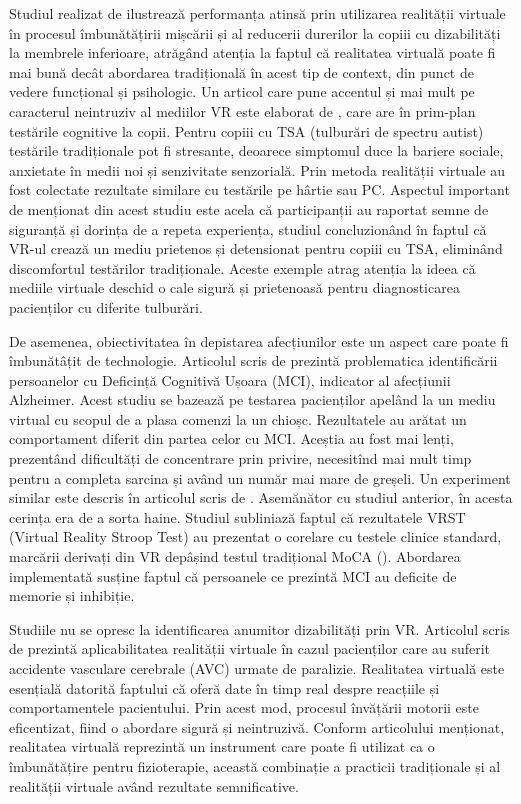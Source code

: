 \documentclass[12pt,a4paper]{report}
\theoremstyle{definition}
\theoremstyle{remark}
\begin{document}
Studiul realizat de \textcite{Saeed2025} ilustrează performanța atinsă prin utilizarea realității virtuale în procesul îmbunătățirii mișcării și al reducerii durerilor la copiii cu dizabilități la membrele inferioare, atrăgând atenția la faptul că realitatea virtuală poate fi mai bună decât abordarea tradițională în acest tip de context, din punct de vedere funcțional și psihologic. Un articol care pune accentul și mai mult pe caracterul neintruziv al mediilor VR este elaborat de \textcite{Tokarskaya2026}, care are în prim-plan testările cognitive la copii. Pentru copiii cu TSA (tulburări de spectru autist) testările tradiționale pot fi stresante, deoarece simptomul duce la bariere sociale, anxietate în medii noi și senzivitate senzorială. Prin metoda realității virtuale au fost colectate rezultate similare cu testările pe hârtie sau PC. Aspectul important de menționat din acest studiu este acela că participanții au raportat semne de siguranță și dorința de a repeta experiența, studiul concluzionând în faptul că VR-ul crează un mediu prietenos și detensionat pentru copiii cu TSA, eliminând discomfortul testărilor tradiționale. Aceste exemple atrag atenția la ideea că mediile virtuale deschid o cale sigură și prietenoasă pentru diagnosticarea pacienților cu diferite tulburări. 

De asemenea, obiectivitatea în depistarea afecțiunilor este un aspect care poate fi îmbunătâțit de technologie. Articolul scris de \textcite{Kim2023} prezintă problematica identificării persoanelor cu Deficință Cognitivă Ușoara (MCI), indicator al afecțiunii Alzheimer. Acest studiu se bazează pe testarea pacienților apelând la un mediu virtual cu scopul de a plasa comenzi la un chioșc. Rezultatele au arătat un comportament diferit din partea celor cu MCI. Aceștia au fost mai lenți, prezentând dificultăți de concentrare prin privire, necesitînd mai mult timp pentru a completa sarcina și având un număr mai mare de greșeli. Un experiment similar este descris în articolul scris de \textcite{Park2025}. Asemănător cu studiul anterior, în acesta cerința era de a sorta haine.  Studiul subliniază faptul că rezultatele VRST (Virtual Reality Stroop Test) au prezentat o corelare cu testele clinice standard, marcării derivați din VR depâșind testul tradițional MoCA (\textcite{Julayanont2013}). Abordarea implementată susține faptul că persoanele ce prezintă MCI au deficite de memorie și inhibiție.

Studiile nu se opresc la identificarea anumitor dizabilități prin VR. Articolul scris de \textcite{Moskiewicz2025}  prezintă aplicabilitatea realității virtuale în cazul pacienților care au suferit accidente vasculare cerebrale (AVC) urmate de paralizie. Realitatea virtuală este esențială datorită faptului că oferă date în timp real despre reacțiile și comportamentele pacientului. Prin acest mod, procesul învățării motorii este eficentizat, fiind o abordare sigură și neintruzivă. Conform articolului menționat, realitatea virtuală reprezintă un instrument care poate fi utilizat ca o îmbunătățire pentru fizioterapie, această combinație a practicii tradiționale și al realității virtuale având rezultate semnificative.
\end{document}
